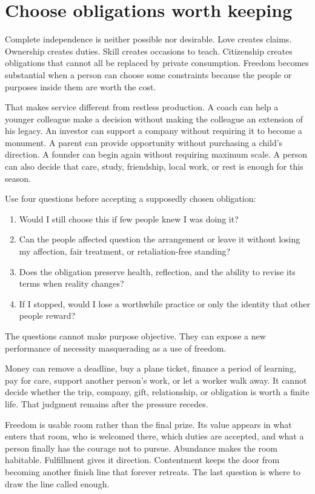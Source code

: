\section{Choose obligations worth keeping}

Complete independence is neither possible nor desirable. Love creates claims.
Ownership creates duties. Skill creates occasions to teach. Citizenship
creates obligations that cannot all be replaced by private consumption.
Freedom becomes substantial when a person can choose some constraints because
the people or purposes inside them are worth the cost.

That makes service different from restless production. A coach can help a
younger colleague make a decision without making the colleague an extension
of his legacy. An investor can support a company without requiring it to
become a monument. A parent can provide opportunity without purchasing a
child's direction. A founder can begin again without requiring maximum scale.
A person can also decide that care, study, friendship, local work, or rest is
enough for this season.

Use four questions before accepting a supposedly chosen obligation:

\begin{enumerate}[itemsep=0.15em]
\item Would I still choose this if few people knew I was doing it?
\item Can the people affected question the arrangement or leave it without
  losing my affection, fair treatment, or retaliation-free standing?
\item Does the obligation preserve health, reflection, and the ability to
  revise its terms when reality changes?
\item If I stopped, would I lose a worthwhile practice or only the identity
  that other people reward?
\end{enumerate}

The questions cannot make purpose objective. They can expose a new performance
of necessity masquerading as a use of freedom.

Money can remove a deadline, buy a plane ticket, finance a period of learning,
pay for care, support another person's work, or let a worker walk away. It
cannot decide whether the trip, company, gift, relationship, or obligation is
worth a finite life. That judgment remains after the pressure recedes.

Freedom is usable room rather than the final prize. Its value appears in what
enters that room, who is welcomed there, which duties are accepted, and what a
person finally has the courage not to pursue. Abundance makes the room
habitable. Fulfillment gives it direction. Contentment keeps the door from
becoming another finish line that forever retreats. The last question is where
to draw the line called enough.
